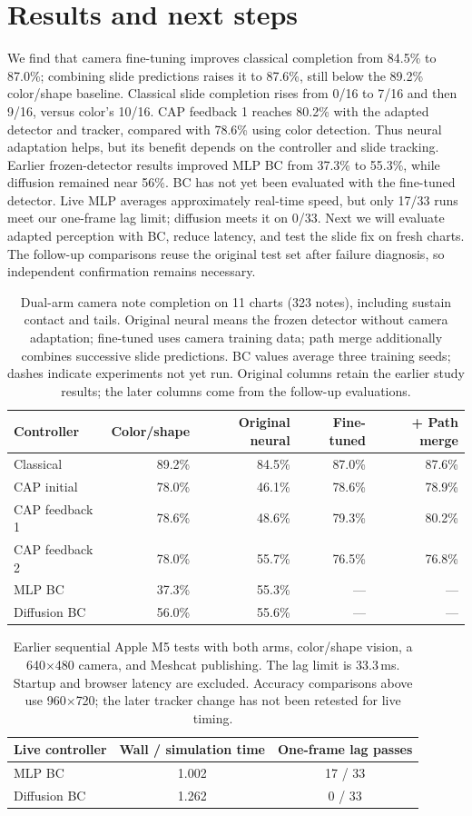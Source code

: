\documentclass[11pt]{article}
\begin{document}
\section*{Results and next steps}
We find that camera fine-tuning improves classical completion from 84.5\% to
87.0\%; combining slide predictions raises it to 87.6\%, still below the
89.2\% color/shape baseline. Classical slide completion rises from 0/16 to
7/16 and then 9/16, versus color's 10/16. CAP feedback 1 reaches 80.2\% with
the adapted detector and tracker, compared with 78.6\% using color detection.
Thus neural adaptation helps, but its benefit depends on the controller and
slide tracking. Earlier frozen-detector results improved MLP BC from 37.3\%
to 55.3\%, while diffusion remained near 56\%. BC has not yet been evaluated
with the fine-tuned detector. Live MLP averages approximately real-time speed,
but only 17/33 runs meet our one-frame lag limit; diffusion meets it on 0/33.
Next we will evaluate adapted perception with BC, reduce latency, and test the
slide fix on fresh charts. The follow-up comparisons reuse the original test
set after failure diagnosis, so independent confirmation remains necessary.
\begin{table}[ht]
\centering
\small
\begin{tabular}{lrrrr}
\toprule
Controller & Color/shape & Original neural & Fine-tuned & + Path merge\\
\midrule
Classical & 89.2\% & 84.5\% & 87.0\% & 87.6\%\\
CAP initial & 78.0\% & 46.1\% & 78.6\% & 78.9\%\\
CAP feedback 1 & 78.6\% & 48.6\% & 79.3\% & 80.2\%\\
CAP feedback 2 & 78.0\% & 55.7\% & 76.5\% & 76.8\%\\
MLP BC & 37.3\% & 55.3\% & --- & ---\\
Diffusion BC & 56.0\% & 55.6\% & --- & ---\\
\bottomrule
\end{tabular}
\caption{Dual-arm camera note completion on 11 charts (323 notes), including
sustain contact and tails. Original neural means the frozen detector without
camera adaptation; fine-tuned uses camera training data; path merge additionally
combines successive slide predictions. BC values average three training seeds;
dashes indicate experiments not yet run. Original columns retain the earlier
study results; the later columns come from the follow-up evaluations.}
\end{table}
\begin{table}[ht]
\centering
\begin{tabular}{lcc}
\toprule
Live controller & Wall / simulation time & One-frame lag passes\\
\midrule
MLP BC & 1.002 & 17 / 33\\
Diffusion BC & 1.262 & 0 / 33\\
\bottomrule
\end{tabular}
\caption{Earlier sequential Apple M5 tests with both arms, color/shape vision,
a 640$\times$480 camera, and Meshcat publishing. The lag limit is 33.3\,ms.
Startup and browser latency are excluded. Accuracy comparisons above use
960$\times$720; the later tracker change has not been retested for live timing.}
\end{table}
\end{document}
